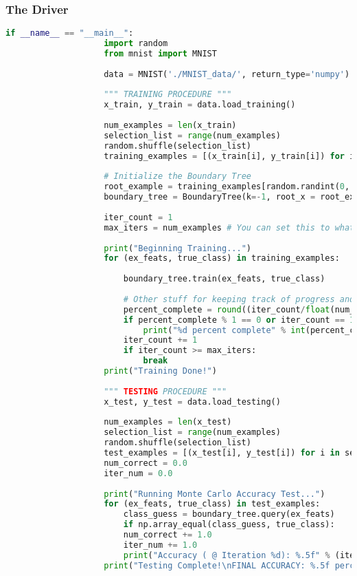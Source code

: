 \documentclass[12pt,letterpaper]{article}
\begin{document}
			\subsubsection{The Driver}
				\begin{lstlisting}[language=Python]
				if __name__ == "__main__":
					import random
					from mnist import MNIST
					
					data = MNIST('./MNIST_data/', return_type='numpy')
					
					""" TRAINING PROCEDURE """
					x_train, y_train = data.load_training()
					
					num_examples = len(x_train)
					selection_list = range(num_examples)
					random.shuffle(selection_list)
					training_examples = [(x_train[i], y_train[i]) for i in selection_list]
					
					# Initialize the Boundary Tree
					root_example = training_examples[random.randint(0, num_examples)]
					boundary_tree = BoundaryTree(k=-1, root_x = root_example[0], root_y = root_example[1])
					
					iter_count = 1
					max_iters = num_examples # You can set this to whatever you want, if time is of the essence. 
					
					print("Beginning Training...")
					for (ex_feats, true_class) in training_examples:
					
						boundary_tree.train(ex_feats, true_class)
						
						# Other stuff for keeping track of progress and when to stop. 
						percent_complete = round((iter_count/float(num_examples)*100.0), 1)
						if percent_complete % 1 == 0 or iter_count == 1:
							print("%d percent complete" % int(percent_complete))
						iter_count += 1
						if iter_count >= max_iters:
							break
					print("Training Done!")
					
					""" TESTING PROCEDURE """
					x_test, y_test = data.load_testing()
					
					num_examples = len(x_test)
					selection_list = range(num_examples)
					random.shuffle(selection_list)
					test_examples = [(x_test[i], y_test[i]) for i in selection_list]
					num_correct = 0.0
					iter_num = 0.0
					
					print("Running Monte Carlo Accuracy Test...")
					for (ex_feats, true_class) in test_examples:
						class_guess = boundary_tree.query(ex_feats)
						if np.array_equal(class_guess, true_class):
						num_correct += 1.0
						iter_num += 1.0
						print("Accuracy ( @ Iteration %d): %.5f" % (iter_num, (num_correct/iter_num)*100.0))
					print("Testing Complete!\nFINAL ACCURACY: %.5f percent correct." % ((num_correct/iter_num)*100.0))
\end{lstlisting}
		
\end{document}
